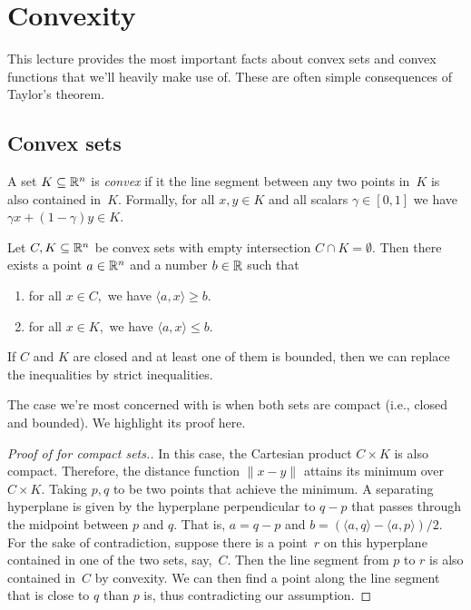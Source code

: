 \section{Convexity}

This lecture provides the most important facts about convex sets and convex
functions that we'll heavily make use of. These are often simple consequences of
Taylor's theorem.

\subsection{Convex sets}

\begin{definition}
A set $K\subseteq\mathbb{R}^n$ is \emph{convex} if it the line segment between any two points in~$K$ is also contained in~$K.$ Formally, for all $x,y\in K$ and all scalars $\gamma\in[0,1]$ we have $\gamma x+(1-\gamma)y\in K.$
\end{definition}

\begin{theorem}
Let $C, K\subseteq\mathbb{R}^n$ be convex sets with empty intersection $C\cap K=\emptyset.$ Then there exists a point $a\in\mathbb{R}^n$ and a number $b\in\mathbb{R}$ such that
\begin{enumerate}
\item for all $x\in C,$ we have $\langle a, x\rangle \ge b.$
\item for all $x\in K,$ we have $\langle a, x\rangle \le b.$
\end{enumerate}
If $C$ and $K$ are closed and at least one of them is bounded, then we can replace the inequalities by strict inequalities.
\end{theorem}
The case we're most concerned with is when both sets are compact (i.e., closed and bounded). We highlight its proof here.
\begin{proof}[Proof of  for compact sets.]
In this case, the Cartesian product $C\times K$ is also compact. Therefore, the
distance function $\|x-y\|$ attains its minimum over $C\times K.$ Taking $p, q$
to be two points that achieve the minimum. A separating hyperplane is given by
the hyperplane perpendicular to $q-p$ that passes through the midpoint between
$p$ and $q.$ That is, $a=q-p$ and $b=(\langle a, q\rangle - \langle a,
p\rangle)/2.$ For the sake of contradiction, suppose there is a point~$r$ on
this hyperplane contained in one of the two sets, say,~$C.$ Then the line
segment from $p$ to $r$ is also contained in~$C$ by convexity. We can then find
a point along the line segment that is close to $q$ than $p$ is, thus
contradicting our assumption.
\end{proof}

